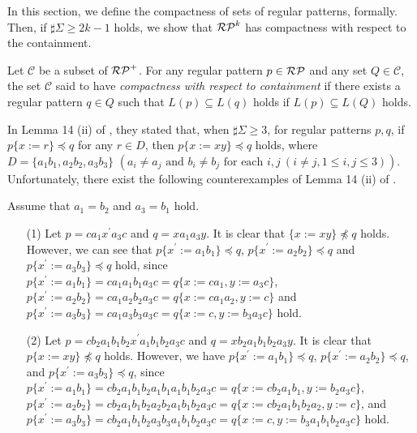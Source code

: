 
In this section, we define the compactness of sets of regular patterns, formally.
Then, if $\sharp\Sigma \ge 2k-1$ holds, 
we show that 
$\mathcal{RP}^{k}$ has compactness with respect to the containment.

\begin{dfn}\label{def:compactness}
Let $\mathcal{C}$ be a subset of $\mathcal{RP}^{+}$. 
For any regular pattern $p \in \mathcal{RP}$ and any set $Q \in \mathcal{C}$,
the set $\mathcal{C}$ said to have {\it compactness with respect to containment}
if there exists a regular pattern $q \in Q$ such that $L(p) \subseteq L(q)$ holds if $L(p) \subseteq L(Q)$ holds.
\end{dfn}

In Lemma 14 (ii) of \cite{Sato1}, 
they stated that, when $\sharp \Sigma \geq 3$, for regular patterns $p,q$, if $p\{x:=r\}\preceq q$ for any $r\in D$, then $p\{x:=xy\} \preceq q$ holds, where 
$D = \{ a_{1}b_{1}, a_{2}b_{2}, a_{3}b_{3}\}$ $(a_{i} \ne a_{j} \mbox{ and } b_{i} \ne b_{j} \mbox{ for each } i,j~(i\ne j, 1\le i,j\le 3))$.
Unfortunately, there exist the following counterexamples of Lemma 14 (ii) of \cite{Sato1}.
\begin{ex}\label{CounterExample_Lemma14}
Assume that $a_1=b_2$ and $a_3=b_1$ hold.
  
\begin{itemize}
\item[(1)] 
Let $p=ca_1x^{\prime}a_3c$ and $q=xa_1a_3y$.
It is clear that $\{x:=xy\} \not\preceq q$ holds.
However, we can see that $p\{x^{\prime}:=a_1b_1\}\preceq q$, $p\{x^{\prime}:=a_2b_2\}\preceq q$ and $p\{x^{\prime}:=a_3b_3\}\preceq q$ hold, 
since
$p\{x^{\prime}:=a_1b_1\}=ca_1a_1b_1a_3c=q\{x:=ca_1,y:=a_3c\}$,
$p\{x^{\prime}:=a_2b_2\}=ca_1a_2b_2a_3c=q\{x:=ca_1a_2,y:=c\}$ and 
$p\{x^{\prime}:=a_3b_3\}=ca_1a_3b_3a_3c=q\{x:=c,y:=b_3a_3c\}$ hold.

\item[(2)] 
Let $p=cb_2a_1b_1b_2x^{\prime}a_1b_1b_2a_3c$ and $q=xb_2a_1b_1b_2a_3y$.
It is clear that $p\{x:=xy\} \not\preceq q$ holds.
However, we have $p\{x^{\prime}:=a_1b_1\}\preceq q$, $p\{x^{\prime}:=a_2b_2\} \preceq q$, and $p\{x^{\prime}:=a_3b_3\} \preceq q$, 
since  
$p\{x^{\prime}:=a_1b_1\}=cb_2a_1b_1b_2a_1b_1a_1b_1b_2a_3c=q\{x:=cb_2a_1b_1,y:=b_2a_3c\}$,
$p\{x^{\prime}:=a_2b_2\}=cb_2a_1b_1b_2a_2b_2a_1b_1b_2a_3c=q\{x:=cb_2a_1b_1b_2a_2,y:=c\}$,
and  $p\{x^{\prime}:=a_3b_3\}=cb_2a_1b_1b_2a_3b_3a_1b_1b_2a_3c=q\{x:=c,y:=b_3a_1b_1b_2a_3c\}$ hold.
\end{itemize}
\end{ex}

